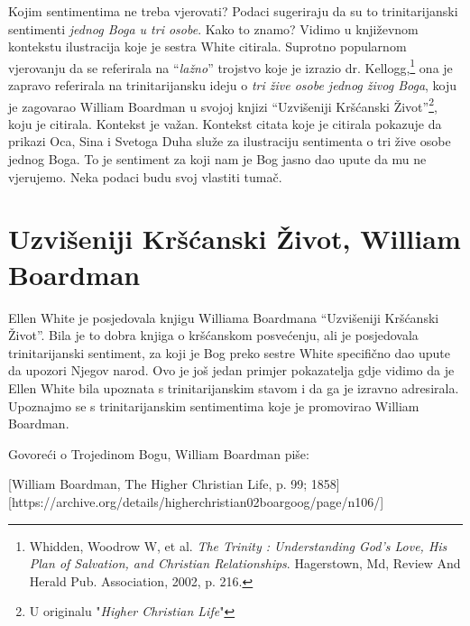 Kojim sentimentima ne treba vjerovati? Podaci sugeriraju da su to trinitarijanski sentimenti \textit{jednog Boga u tri osobe}. Kako to znamo? Vidimo u književnom kontekstu ilustracija koje je sestra White citirala. Suprotno popularnom vjerovanju da se referirala na “\textit{lažno}” trojstvo koje je izrazio dr. Kellogg,\footnote{Whidden, Woodrow W, et al. \textit{The Trinity : Understanding God's Love, His Plan of Salvation, and Christian Relationships}. Hagerstown, Md, Review And Herald Pub. Association, 2002, p. 216.} ona je zapravo referirala na trinitarijansku ideju o \textit{tri žive osobe jednog živog Boga}, koju je zagovarao William Boardman u svojoj knjizi “Uzvišeniji Kršćanski Život”\footnote{U originalu "\textit{Higher Christian Life}"}, koju je citirala. Kontekst je važan. Kontekst citata koje je citirala pokazuje da prikazi Oca, Sina i Svetoga Duha služe za ilustraciju sentimenta o tri žive osobe jednog Boga. To je sentiment za koji nam je Bog jasno dao upute da mu ne vjerujemo. Neka podaci budu svoj vlastiti tumač.

\section*{Uzvišeniji Kršćanski Život, William Boardman}

Ellen White je posjedovala knjigu Williama Boardmana “Uzvišeniji Kršćanski Život”. Bila je to dobra knjiga o kršćanskom posvećenju, ali je posjedovala trinitarijanski sentiment, za koji je Bog preko sestre White specifično dao upute da upozori Njegov narod. Ovo je još jedan primjer pokazatelja gdje vidimo da je Ellen White bila upoznata s trinitarijanskim stavom i da ga je izravno adresirala. Upoznajmo se s trinitarijanskim sentimentima koje je promovirao William Boardman.

Govoreći o Trojedinom Bogu, William Boardman piše:

[William Boardman, The Higher Christian Life, p. 99; 1858][https://archive.org/details/higherchristian02boargoog/page/n106/]

